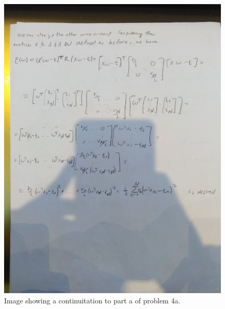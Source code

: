 \documentclass[12pt]{article}
\begin{document}
\begin{figure}[!htbp]
\centering
\includegraphics[width=15cm]{problem4a_2.jpg}
\caption{Image showing a continuitation to part a of problem 4a.}
\end{figure}
\end{document}
